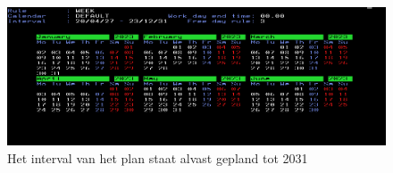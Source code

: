 \begin{figure}[h]
	\centering
	\includegraphics[width=1\linewidth]{img/Caleder2030}
	\caption[Kalender IWS 2030]{Het interval van het plan staat alvast gepland tot 2031}
	\label{fig:caleder2030}
\end{figure}

 

